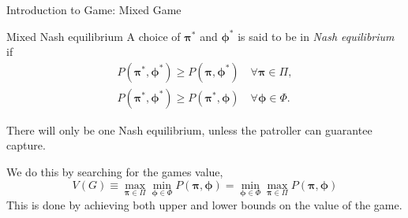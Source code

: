 \documentclass[11pt]{beamer}
\begin{document}
\begin{frame}{Introduction to Game: Mixed Game}
\begin{block}{Mixed Nash equilibrium}
A choice of $\bm{\pi}^*$ and $\bm{\phi}^*$ is said to be in \textit{Nash equilibrium} if 
\begin{align*}
P(\bm{\pi}^*,\bm{\phi}^*) \geq P(\bm{\pi},\bm{\phi}^*) \quad \forall \bm{\pi} \in \Pi , \\
P(\bm{\pi}^*,\bm{\phi}^*) \geq P(\bm{\pi}^*,\bm{\phi}) \quad \forall \bm{\phi} \in \Phi .
\end{align*}
\end{block}
There will only be one Nash equilibrium, unless the patroller can guarantee capture.

We do this by searching for the games value, $$V(G) \equiv \max\limits_{\bm{\pi} \in \Pi} \min\limits_{\bm{\phi} \in \Phi} P(\bm{\pi},\bm{\phi})=\min\limits_{\bm{\phi} \in \Phi} \max\limits_{\bm{\pi} \in \Pi} P(\bm{\pi},\bm{\phi})$$
This is done by achieving both upper and lower bounds on the value of the game.
\end{frame}
\end{document}
